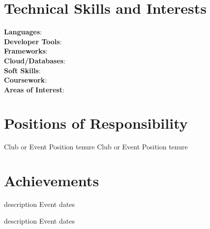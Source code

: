 \documentclass{article}
\begin{document}
\section{\textbf{Technical Skills and Interests}}
 \begin{itemize}[leftmargin=0.05in, label={}]
    \small{\item{
     \textbf{Languages}{: } \\
     \textbf{Developer Tools}{: } \\
     \textbf{Frameworks}{: } \\
     \textbf{Cloud/Databases}{: } \\
     \textbf{Soft Skills}{: } \\
     \textbf{Coursework}{: } \\
     \textbf{Areas of Interest}{: } \\
    }}
 \end{itemize}
 \vspace{-16pt}



\section{\textbf{Positions of Responsibility}}
\vspace{-0.4mm}
\resumeSubHeadingListStart
{} %
    {Club or Event} %
    {Position tenure} %
    {Club or Event} %
    {Position tenure} %
\resumeSubHeadingListEnd
\vspace{-5mm}




\section{\textbf{Achievements}}
\vspace{-0.4mm}
\resumeSubHeadingListStart
{} %
    {description} %
    {Event dates} %
    
    {description} %
    {Event dates} %
\resumeSubHeadingListEnd
\vspace{-5mm}



\end{document}
